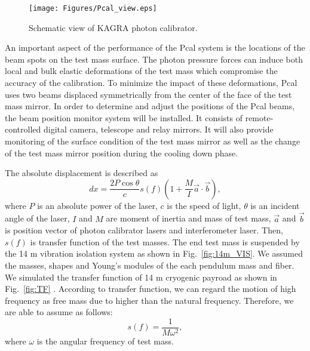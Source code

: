 \begin{figure}
\begin{center}
\texttt{[image: Figures/Pcal\_view.eps]}
\caption{Schematic view of KAGRA photon calibrator. } 
\label{fig:Pcal_view} 
\end{center}
\end{figure}



An important aspect of the performance of the Pcal system is the locations 
of the beam spots on the test mass surface. The photon pressure forces can 
induce both local and bulk elastic deformations of the test mass which 
compromise the accuracy of the calibration. To minimize the impact of these 
deformations, Pcal uses two beams displaced symmetrically from the center 
of the face of the test mass mirror. In order to determine and adjust the 
positions of the Pcal beams, the beam position monitor system will be 
installed. It consists of remote-controlled digital camera, telescope and 
relay mirrors. It will also provide monitoring of the surface condition of 
the test mass mirror as well as the change of the test mass mirror position 
during the cooling down phase.


The absolute displacement is described as
\begin{equation}
dx=\frac{2 P \cos{\theta}}{c} s(f) \left( 1+\frac{M}{I}\vec{a}\cdot \vec{b}\right), \label{eq:dx}
\end{equation}
where $P$ is an absolute power of the laser, $c$ is the speed of light, $\theta$  is an incident angle of the laser, $I$ and $M$ are moment of inertia and mass of test mass, $\vec{a}$ and $\vec{b}$ is position vector of photon calibrator lasers and interferometer laser. Then, $s(f)$ is transfer function of the test masses. The end test mass is suspended by the 14 m vibration isolation system as shown in Fig.~\ref{fig:14m_VIS}.
We assumed the masses, shapes and Young's modules of the each pendulum mass and fiber. %
We simulated the transfer function of 14 m cryogenic payroad as shown in Fig.~\ref{fig:TF} . 
According to transfer function, we can regard the motion of high frequency as free mass due to higher than the natural frequency. Therefore, we are able to assume as follows:
\begin{equation}
s(f)=\frac{1}{M \omega^2},
\end{equation}
where $\omega$ is the angular frequency of test mass.

